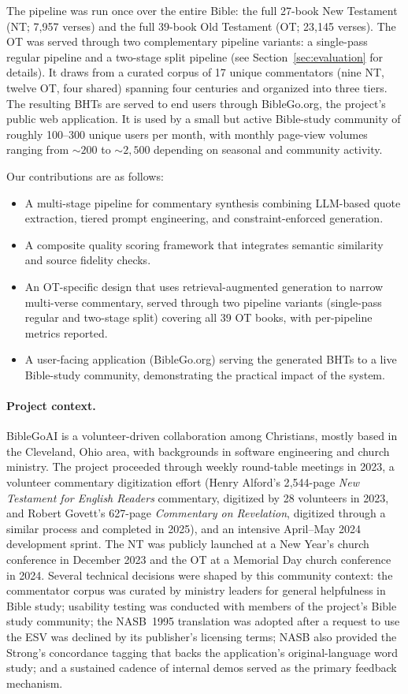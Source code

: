 The pipeline was run once over the entire Bible: the full 27-book New Testament (NT; 7{,}957 verses) and the full 39-book Old Testament (OT; 23{,}145 verses). The OT was served through two complementary pipeline variants: a single-pass regular pipeline and a two-stage split pipeline (see Section~\ref{sec:evaluation} for details). It draws from a curated corpus of 17 unique commentators (nine NT, twelve OT, four shared) spanning four centuries and organized into three tiers. The resulting BHTs are served to end users through BibleGo.org, the project's public web application. It is used by a small but active Bible-study community of roughly 100--300 unique users per month, with monthly page-view volumes ranging from ${\sim}200$ to ${\sim}2{,}500$ depending on seasonal and community activity.

Our contributions are as follows:
\begin{itemize}[nosep,leftmargin=*]
    \item A multi-stage pipeline for commentary synthesis combining LLM-based quote extraction, tiered prompt engineering, and constraint-enforced generation.
    \item A composite quality scoring framework that integrates semantic similarity and source fidelity checks.
    \item An OT-specific design that uses retrieval-augmented generation to narrow multi-verse commentary, served through two pipeline variants (single-pass regular and two-stage split) covering all 39 OT books, with per-pipeline metrics reported.
    \item A user-facing application (BibleGo.org) serving the generated BHTs to a live Bible-study community, demonstrating the practical impact of the system.
\end{itemize}

\paragraph{Project context.} BibleGoAI is a volunteer-driven collaboration among Christians, mostly based in the Cleveland, Ohio area, with backgrounds in software engineering and church ministry. The project proceeded through weekly round-table meetings in 2023, a volunteer commentary digitization effort (Henry Alford's 2{,}544-page \textit{New Testament for English Readers} commentary, digitized by 28 volunteers in 2023, and Robert Govett's 627-page \textit{Commentary on Revelation}, digitized through a similar process and completed in 2025), and an intensive April--May 2024 development sprint. The NT was publicly launched at a New Year's church conference in December 2023 and the OT at a Memorial Day church conference in 2024. Several technical decisions were shaped by this community context: the commentator corpus was curated by ministry leaders for general helpfulness in Bible study; usability testing was conducted with members of the project's Bible study community; the NASB~1995 translation was adopted after a request to use the ESV was declined by its publisher's licensing terms; NASB also provided the Strong's concordance tagging that backs the application's original-language word study; and a sustained cadence of internal demos served as the primary feedback mechanism.
